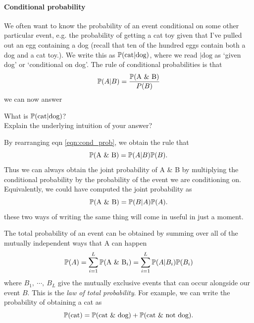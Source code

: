 \paragraph{Conditional probability}
We often want to know the probability of an event conditional on some
other particular event, e.g. the probability of getting a cat toy
given that I've pulled out an egg containing a dog (recall that ten of the hundred eggs contain both a dog and a cat toy.). 
We write this as $\P(\textrm{cat} | \textrm{dog})$, where we read $|
\textrm{dog}$ as `given dog' or `conditional on dog'.  The rule of conditional probabilities is that
\begin{equation}
\P(A | B) = \frac{\P(\textrm{A \& B} )}{P(B)}  \label{eqn:cond_prob}
\end{equation}
we can now answer
\begin{question} \label{question:cond}
What is $ \P(\textrm{cat} | \textrm{dog})$?\\
Explain the underlying intuition of your answer? \\
\end{question}
By rearranging eqn \eqref{eqn:cond_prob}, we obtain the rule that
\begin{equation}
\P(\textrm{A \& B}) = \P(A | B) \P(B) .
\end{equation}
Thus we can always obtain the joint probability of A \& B by
multiplying the conditional probability by the probability of the
event we are conditioning on. Equivalently, we could have computed the
joint probability as
\begin{equation}
\P(\textrm{A \& B}) = \P(B | A) \P(A) .
\end{equation}
these two ways of writing the same thing will come in useful in just a
moment.

The total probability of an event can be obtained by summing over
all of the mutually independent ways that A can happen
\begin{equation}
  \P(A)  = \sum_{i=1}^L \P(\textrm{A \& B$_i$}) = \sum_{i=1}^L \P(A | B_i) \P(B_i)  
\end{equation}
where $B_1,~\cdots,~B_L$ give the mutually exclusive events
that can occur alongside our event $B$. This is the \emph{law of total
  probability}. For example, we can write the probability of obtaining
a cat as
\begin{equation}
 \P(\textrm{cat}) = \P(\textrm{cat \& dog}) + \P(\textrm{cat \& not dog}). 
\end{equation}

